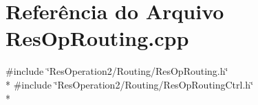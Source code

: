 \section{Referência do Arquivo Res\+Op\+Routing.\+cpp}
\label{_res_op_routing_8cpp}
{\ttfamily \#include \char`\"{}Res\+Operation2/\+Routing/\+Res\+Op\+Routing.\+h\char`\"{}}\\*
{\ttfamily \#include \char`\"{}Res\+Operation2/\+Routing/\+Res\+Op\+Routing\+Ctrl.\+h\char`\"{}}\\*
